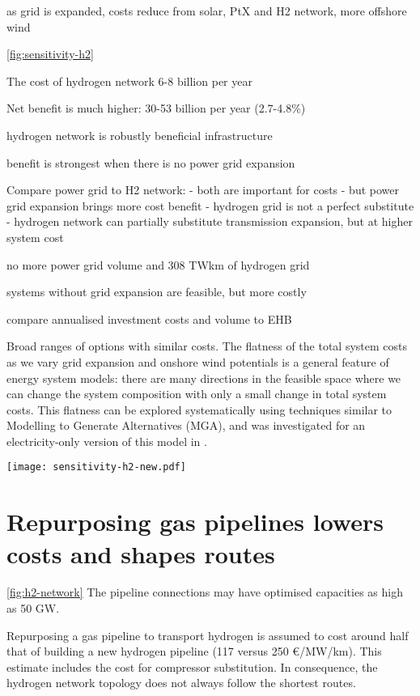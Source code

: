 as grid is expanded, costs reduce from solar, PtX and H2 network, more offshore wind


\cref{fig:sensitivity-h2}

The cost of hydrogen network 6-8 billion per year

Net benefit is much higher: 30-53 billion per year (2.7-4.8\%)

hydrogen network is robustly beneficial infrastructure

benefit is strongest when there is no power grid expansion

Compare power grid to H2 network:
- both are important for costs
- but power grid expansion brings more cost benefit
- hydrogen grid is not a perfect substitute
- hydrogen network can partially substitute transmission expansion, but at higher system cost


no more power grid volume and 308 TWkm of hydrogen grid

systems without grid expansion are feasible, but more costly

compare annualised investment costs and volume to EHB

Broad ranges of options with similar costs. The flatness of the total system
costs as we vary grid expansion and onshore wind potentials is a general feature
of energy system models: there are many directions in the feasible space where
we can change the system composition with only a small change in total system
costs. This flatness can be explored systematically using techniques similar to
Modelling to Generate Alternatives (MGA), and was investigated for an
electricity-only version of this model in \cite{Neumann2019}.

\begin{SCfigure}
    \centering
    \texttt{[image: sensitivity-h2-new.pdf]}
    \caption{Benefits of electricity and hydrogen network infrastructure.}
    \label{fig:sensitivity-h2}
\end{SCfigure}


\section*{Repurposing gas pipelines lowers costs and shapes routes}
\label{sec:repurposed}


\cref{fig:h2-network}
The pipeline connections may have optimised capacities as high as 50 GW.


Repurposing a gas pipeline to transport hydrogen is assumed to cost around half
that of building a new hydrogen pipeline (117 versus 250 \euro/MW/km). This
estimate includes the cost for compressor substitution. In consequence, the
hydrogen network topology does not always follow the shortest routes.

